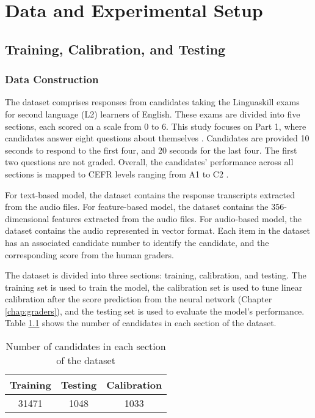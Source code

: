 \chapter{Data and Experimental Setup} \label{chap:setup}

\section{Training, Calibration, and Testing}

\subsection{Data Construction} \label{sec:data_construction}
The dataset comprises responses from candidates taking the Linguaskill exams for second language (L2)  learners of English. These exams are divided into five sections, each scored on a scale from 0 to 6. This study focuses on Part 1, where candidates answer eight questions about themselves \cite{linguaskills}. Candidates are provided 10 seconds to respond to the first four, and 20 seconds for the last four. The first two questions are not graded. Overall, the candidates' performance across all sections is mapped to CEFR levels ranging from A1 to C2 \cite{CEFR}.

For text-based model, the dataset contains the response transcripts extracted from the audio files. For feature-based model, the dataset contains the 356-dimensional features extracted from the audio files. For audio-based model, the dataset contains the audio represented in vector format. Each item in the dataset has an associated candidate number to identify the candidate, and the corresponding score from the human graders.

The dataset is divided into three sections: training, calibration, and testing. The training set is used to train the model, the calibration set is used to tune linear calibration after the score prediction from the neural network (Chapter \ref{chap:graders}), and the testing set is used to evaluate the model's performance. Table \ref{tab:data_size} shows the number of candidates in each section of the dataset.

\begin{table}[H]
  \centering
  \begin{tabular}{|c|c|c|}
    \hline
    \textbf{Training} & \textbf{Testing} & \textbf{Calibration} \\ \hline
    31471             & 1048             & 1033                 \\ \hline
  \end{tabular}
  \caption{Number of candidates in each section of the dataset}
  \label{tab:data_size}
\end{table}

